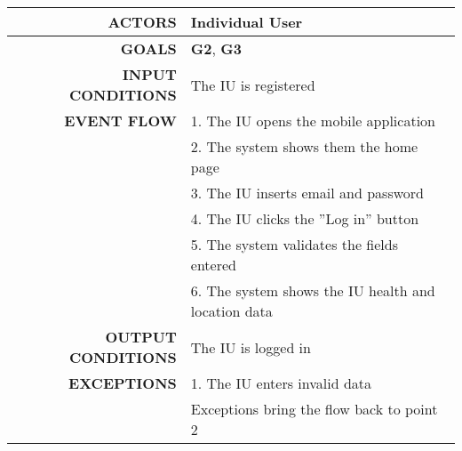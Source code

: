 \begin{table}[h!]
\begin{tabular}{|r|p{3in}|}
\hline
\textbf{ACTORS} & Individual User\\
\hline
\textbf{GOALS} &	\textbf{G2}, \textbf{G3}\\
\hline
\textbf{INPUT CONDITIONS} & The IU is registered \\
\hline
\textbf{EVENT FLOW} 
&1. The IU opens the mobile application\\
&2. The system shows them the home page\\
&3. The IU inserts email and password\\
&4. The IU clicks the ''Log in'' button\\
&5. The system validates the fields entered\\
&6. The system shows the IU health and location data \\
\hline
\textbf{OUTPUT CONDITIONS} & The IU is logged in \\
\hline
\textbf{EXCEPTIONS} 
&1. The IU enters invalid data  \\
&Exceptions bring the flow back to point 2 \\
\hline
\end{tabular}
\end{table}